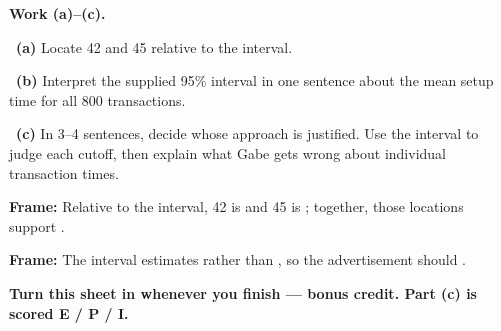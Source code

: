 \documentclass[11pt]{article}
\begin{document}
\newpage
\textbf{Work (a)--(c).}\par\smallskip

~\textbf{(a)} Locate 42 and 45 relative to the interval.\par
\workspace{0.7in}

~\textbf{(b)} Interpret the supplied 95\% interval in one sentence about the mean setup time for all 800 transactions.\par
\workspace{1.4in}

~\textbf{(c)} In 3--4 sentences, decide whose approach is justified. Use the interval to judge each cutoff, then explain what Gabe gets wrong about individual transaction times.\par
\workspace{2.0in}

\begin{sentenceframebox}\raggedright\textbf{Frame:} Relative to the interval, 42 is \blank[1.0in] and 45 is \blank[1.0in]; together, those locations support \blank[2.5in].\end{sentenceframebox}

\begin{sentenceframebox}\raggedright\textbf{Frame:} The interval estimates \blank[2.0in] rather than \blank[1.9in], so the advertisement should \blank[2.0in].\end{sentenceframebox}

\textbf{Turn this sheet in whenever you finish --- bonus credit. Part (c) is scored E / P / I.}\par
\end{document}
